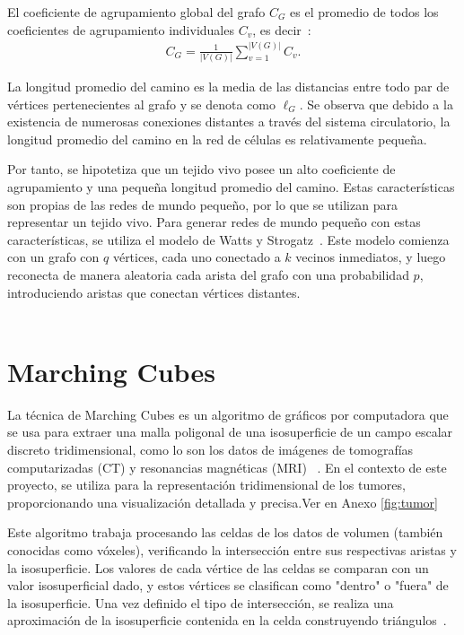 El coeficiente de agrupamiento global del grafo $C_G$ es el promedio de todos los coeficientes de agrupamiento individuales $C_v$, es decir~\cite{7}:
\begin{align}
C_G = \displaystyle\frac{1}{|V(G)|}\sum _{v=1} ^{|V(G)|} C_v. \label{eq-global-clustering}
\end{align}

La longitud promedio del camino es la media de las distancias entre todo par de v\'ertices pertenecientes al grafo y se denota como $\ell_G$. Se observa que debido a la existencia de numerosas conexiones distantes a través del sistema circulatorio, la longitud promedio del camino en la red de células es relativamente pequeña.

Por tanto, se hipotetiza que un tejido vivo posee un alto coeficiente de agrupamiento y una pequeña longitud promedio del camino. Estas características son propias de las redes de mundo pequeño, por lo que se utilizan para representar un tejido vivo. Para generar redes de mundo pequeño con estas características, se utiliza el modelo de Watts y Strogatz~\cite{9}. Este modelo comienza con un grafo con $q$ vértices, cada uno conectado a $k$ vecinos inmediatos, y luego reconecta de manera aleatoria cada arista del grafo con una probabilidad $p$, introduciendo aristas que conectan vértices distantes.\\
\\
\section{Marching Cubes}

La técnica de Marching Cubes es un algoritmo de gráficos por computadora que se usa para extraer una malla poligonal de una isosuperficie de un campo escalar discreto tridimensional, como lo son los datos de imágenes de tomografías computarizadas (CT) y resonancias magnéticas (MRI) ~\cite{5}. En el contexto de este proyecto, se utiliza para la representación tridimensional de los tumores, proporcionando una visualización detallada y precisa.Ver en Anexo \ref{fig:tumor}

Este algoritmo trabaja procesando las celdas de los datos de volumen (también conocidas como vóxeles), verificando la intersección entre sus respectivas aristas y la isosuperficie. Los valores de cada vértice de las celdas se comparan con un valor isosuperficial dado, y estos vértices se clasifican como "dentro"  o  "fuera" de la isosuperficie. Una vez definido el tipo de intersección, se realiza una aproximación de la isosuperficie contenida en la celda construyendo triángulos~\cite{1}.

